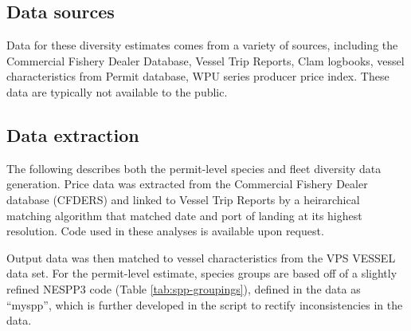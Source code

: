 \documentclass[
]{book}
\begin{document}
\hypertarget{data-sources-5}{%
\subsection{Data sources}\label{data-sources-5}}

Data for these diversity estimates comes from a variety of sources, including the
Commercial Fishery Dealer Database, Vessel Trip Reports, Clam logbooks, vessel characteristics from Permit database, WPU series producer price index. These data are typically not available to the public.

\hypertarget{data-extraction-5}{%
\subsection{Data extraction}\label{data-extraction-5}}

The following describes both the permit-level species and fleet diversity data generation. Price data was extracted from the Commercial Fishery Dealer database (CFDERS) and linked to Vessel Trip Reports by a heirarchical matching algorithm that matched date and port of landing at its highest resolution. Code used in these analyses is available upon request.

Output data was then matched to vessel characteristics from the VPS VESSEL data set. For the permit-level estimate, species groups are based off of a slightly refined NESPP3 code (Table \ref{tab:spp-groupings}), defined in the data as ``myspp'', which is further developed in the script to rectify inconsistencies in the data.

\begingroup\fontsize{8}{10}\selectfont
\end{document}
